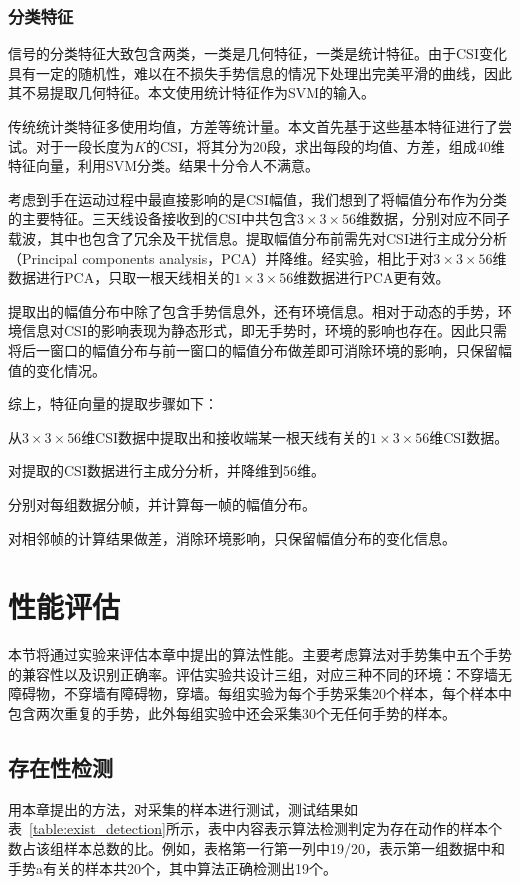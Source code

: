 \subsubsection{分类特征}
信号的分类特征大致包含两类，一类是几何特征，一类是统计特征。由于CSI变化具有一定的随机性，难以在不损失手势信息的情况下处理出完美平滑的曲线，因此其不易提取几何特征。本文使用统计特征作为SVM的输入。

传统统计类特征多使用均值，方差等统计量。本文首先基于这些基本特征进行了尝试。对于一段长度为$K$的CSI，将其分为20段，求出每段的均值、方差，组成40维特征向量，利用SVM分类。结果十分令人不满意。

考虑到手在运动过程中最直接影响的是CSI幅值，我们想到了将幅值分布作为分类的主要特征。三天线设备接收到的CSI中共包含$3 \times 3 \times 56$维数据，分别对应不同子载波，其中也包含了冗余及干扰信息。提取幅值分布前需先对CSI进行主成分分析（Principal components analysis，PCA）并降维。经实验，相比于对$3 \times 3 \times 56$维数据进行PCA，只取一根天线相关的$1 \times 3 \times 56$维数据进行PCA更有效。

提取出的幅值分布中除了包含手势信息外，还有环境信息。相对于动态的手势，环境信息对CSI的影响表现为静态形式，即无手势时，环境的影响也存在。因此只需将后一窗口的幅值分布与前一窗口的幅值分布做差即可消除环境的影响，只保留幅值的变化情况。

综上，特征向量的提取步骤如下：

\begin{compactenum}
\item 从$3 \times 3 \times 56$维CSI数据中提取出和接收端某一根天线有关的$1 \times 3 \times 56$维CSI数据。
\item 对提取的CSI数据进行主成分分析，并降维到56维。
\item 分别对每组数据分帧，并计算每一帧的幅值分布。
\item 对相邻帧的计算结果做差，消除环境影响，只保留幅值分布的变化信息。
\end{compactenum}

\section{性能评估}
本节将通过实验来评估本章中提出的算法性能。主要考虑算法对手势集中五个手势的兼容性以及识别正确率。评估实验共设计三组，对应三种不同的环境：不穿墙无障碍物，不穿墙有障碍物，穿墙。每组实验为每个手势采集20个样本，每个样本中包含两次重复的手势，此外每组实验中还会采集30个无任何手势的样本。

\subsection{存在性检测}
用本章提出的方法，对采集的样本进行测试，测试结果如表~\ref{table:exist_detection}所示，表中内容表示算法检测判定为存在动作的样本个数占该组样本总数的比。例如，表格第一行第一列中19/20，表示第一组数据中和手势a有关的样本共20个，其中算法正确检测出19个。

